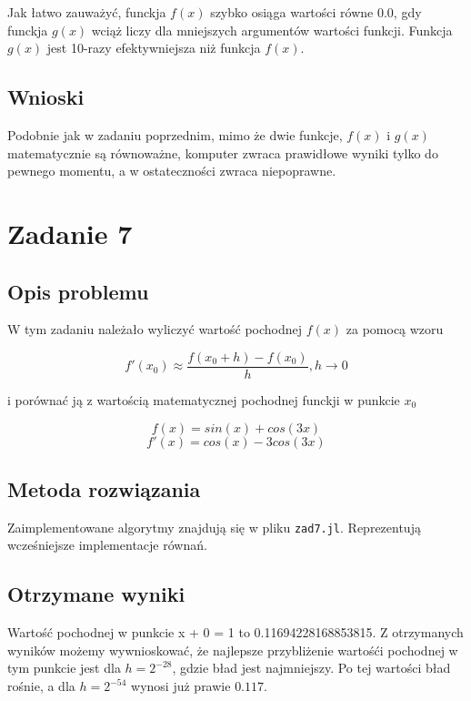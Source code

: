 \documentclass{article}
\begin{document}
Jak łatwo zauważyć, funckja \(f(x)\) szybko osiąga wartości równe 0.0, gdy funckja \(g(x)\) wciąż liczy dla mniejszych argumentów wartości funkcji. Funkcja \(g(x)\) jest 10-razy efektywniejsza niż funkcja \(f(x)\).

\subsection{Wnioski}

Podobnie jak w zadaniu poprzednim, mimo że dwie funkcje, \(f(x)\) i \(g(x)\) matematycznie są równoważne, komputer zwraca prawidłowe wyniki tylko do pewnego momentu, a w ostateczności zwraca niepoprawne.

\section{Zadanie 7}

\subsection{Opis problemu}

W tym zadaniu należało wyliczyć wartość pochodnej \(f(x)\) za pomocą wzoru

$$\left. f'(x_{0}) \approx \frac{f(x_{0} + h) - f(x_{0})}{h}, h \rightarrow 0\right.$$

i porównać ją z wartością matematycznej pochodnej funckji w punkcie \(x_{0}\)

$$f(x) = sin(x) + cos(3x)$$
$$f'(x) = cos(x) - 3cos(3x)$$

\subsection{Metoda rozwiązania}

Zaimplementowane algorytmy znajdują się w pliku \texttt{zad7.jl}. Reprezentują wcześniejsze implementacje równań.

\subsection{Otrzymane wyniki}

Wartość pochodnej w punkcie x + 0 = 1 to 0.11694228168853815. Z otrzymanych wyników możemy wywnioskować, że najlepsze przybliżenie wartośći pochodnej w tym punkcie jest dla \(h=2^{-28}\), gdzie bład jest najmniejszy. Po tej wartości bład rośnie, a dla \(h=2^{-54}\) wynosi już prawie \(0.117\).
\end{document}
